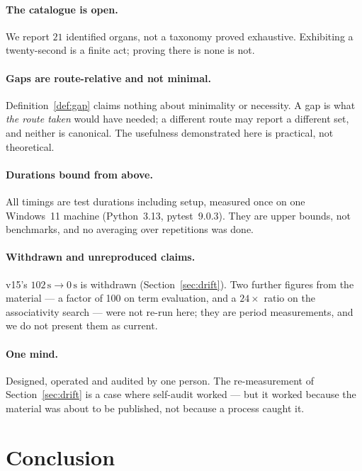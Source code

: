 \documentclass[11pt]{article}
\theoremstyle{remark}\newtheorem{remark}{Remark}
\begin{document}
\paragraph{The catalogue is open.} We report $21$ identified organs, not a taxonomy proved
exhaustive. Exhibiting a twenty-second is a finite act; proving there is none is not.

\paragraph{Gaps are route-relative and not minimal.} Definition~\ref{def:gap} claims
nothing about minimality or necessity. A gap is what \emph{the route taken} would have
needed; a different route may report a different set, and neither is canonical. The
usefulness demonstrated here is practical, not theoretical.

\paragraph{Durations bound from above.} All timings are test durations including setup,
measured once on one Windows~11 machine (Python~3.13, pytest~9.0.3). They are upper
bounds, not benchmarks, and no averaging over repetitions was done.

\paragraph{Withdrawn and unreproduced claims.} v15's $102\,\mathrm{s} \to 0\,\mathrm{s}$
is withdrawn (Section~\ref{sec:drift}). Two further figures from the material --- a factor
of 100 on term evaluation, and a $24\times$ ratio on the associativity search --- were not
re-run here; they are period measurements, and we do not present them as current.

\paragraph{One mind.} Designed, operated and audited by one person. The re-measurement of
Section~\ref{sec:drift} is a case where self-audit worked --- but it worked because the
material was about to be published, not because a process caught it.

\section{Conclusion}
\end{document}
